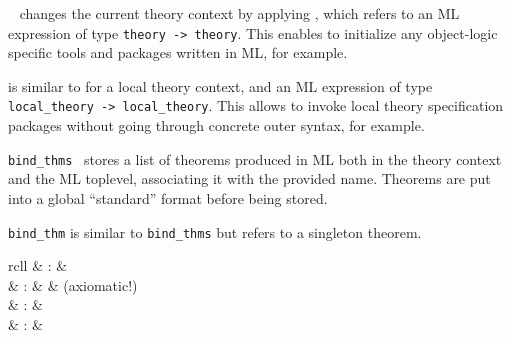 \begin{isabellebody}
\begin{isamarkuptext}
\begin{description}
  \item \hyperlink{command.setup}{\mbox{}}~ changes the current theory
  context by applying , which refers to an ML expression
  of type \verb|theory -> theory|.  This enables to initialize
  any object-logic specific tools and packages written in ML, for
  example.

  \item \hyperlink{command.local-setup}{\mbox{}} is similar to \hyperlink{command.setup}{\mbox{}} for
  a local theory context, and an ML expression of type \verb|local_theory -> local_theory|.  This allows to
  invoke local theory specification packages without going through
  concrete outer syntax, for example.

  \item \verb|bind_thms|~ stores a list of
  theorems produced in ML both in the theory context and the ML
  toplevel, associating it with the provided name.  Theorems are put
  into a global ``standard'' format before being stored.

  \item \verb|bind_thm| is similar to \verb|bind_thms| but refers to a
  singleton theorem.
  
  \end{description}%
\end{isamarkuptext}%
\isamarkuptrue%
%
\isamarkuptrue%
%
\isamarkuptrue%
%
\begin{isamarkuptext}%
\begin{matharray}{rcll}
    \hypertarget{command.classes}{\hyperlink{command.classes}{\mbox{}}} & : &  \\
    \hypertarget{command.classrel}{\hyperlink{command.classrel}{\mbox{}}} & : &  & (axiomatic!) \\
    \hypertarget{command.defaultsort}{\hyperlink{command.defaultsort}{\mbox{}}} & : &  \\
    \hypertarget{command.class-deps}{\hyperlink{command.class-deps}{\mbox{}}}\isa{{\isachardoublequote}\isactrlsup {\isacharasterisk}{\isachardoublequote}} & : &  \\
  \end{matharray}


\end{isamarkuptext}
\end{isabellebody}
